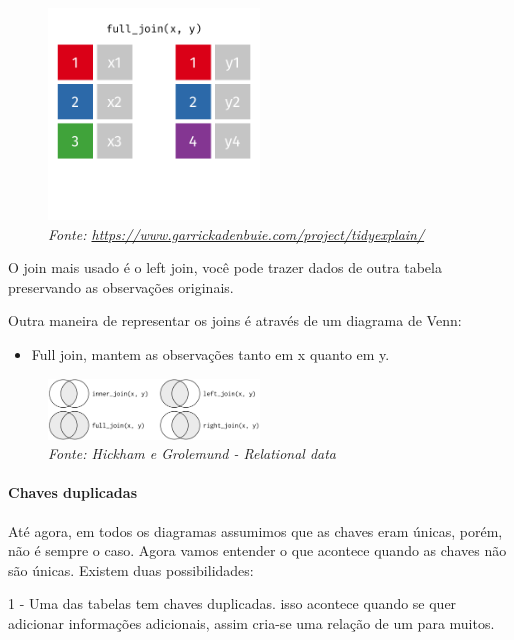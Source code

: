 \documentclass[
]{article}
\providecommand{\tightlist}{%
  \setlength{\itemsep}{0pt}\setlength{\parskip}{0pt}}
\begin{document}
\begin{figure}
\centering
\includegraphics[width=0.5\textwidth,height=\textheight]{full-join.gif}
\caption{\emph{Fonte:
\url{https://www.garrickadenbuie.com/project/tidyexplain/}}}
\end{figure}

O join mais usado é o left join, você pode trazer dados de outra tabela
preservando as observações originais.

Outra maneira de representar os joins é através de um diagrama de Venn:

\begin{itemize}
\tightlist
\item
  Full join, mantem as observações tanto em x quanto em y.
\end{itemize}

\begin{figure}
\centering
\includegraphics[width=0.5\textwidth,height=\textheight]{join-venn.png}
\caption{\emph{Fonte: Hickham e Grolemund - Relational data}}
\end{figure}

\hypertarget{chaves-duplicadas}{%
\paragraph{Chaves duplicadas}\label{chaves-duplicadas}}

Até agora, em todos os diagramas assumimos que as chaves eram únicas,
porém, não é sempre o caso. Agora vamos entender o que acontece quando
as chaves não são únicas. Existem duas possibilidades:

1 - Uma das tabelas tem chaves duplicadas. isso acontece quando se quer
adicionar informações adicionais, assim cria-se uma relação de um para
muitos.
\end{document}
